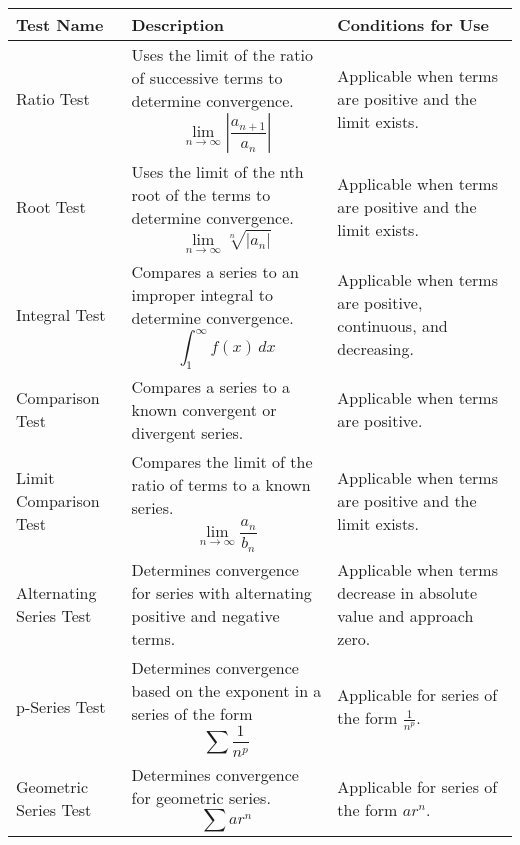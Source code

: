 \begin{table}[htbp]
    \centering
    \begin{tabular}{| m{3cm} | m{7cm} | m{4cm} |}
        \hline
        \textbf{Test Name}         & \textbf{Description}                                                                                                                   & \textbf{Conditions for Use}                                         \\
        \hline
        Ratio Test                 & Uses the limit of the ratio of successive terms to determine convergence. \[ \lim_{n \to \infty} \left| \frac{a_{n+1}}{a_n} \right| \] & Applicable when terms are positive and the limit exists.            \\
        \hline
        Root Test                  & Uses the limit of the nth root of the terms to determine convergence. \[ \lim_{n \to \infty} \sqrt[n]{|a_n|} \]                        & Applicable when terms are positive and the limit exists.            \\
        \hline
        Integral Test              & Compares a series to an improper integral to determine convergence. \[ \int_{1}^{\infty} f(x) \, dx \]                                 & Applicable when terms are positive, continuous, and decreasing.     \\
        \hline
        Comparison Test            & Compares a series to a known convergent or divergent series.                                                                           & Applicable when terms are positive.                                 \\
        \hline
        Limit Comparison Test      & Compares the limit of the ratio of terms to a known series. \[ \lim_{n \to \infty} \frac{a_n}{b_n} \]                                  & Applicable when terms are positive and the limit exists.            \\
        \hline
        Alternating Series Test    & Determines convergence for series with alternating positive and negative terms.                                                        & Applicable when terms decrease in absolute value and approach zero. \\
        \hline
        p-Series Test              & Determines convergence based on the exponent in a series of the form \[ \sum \frac{1}{n^p} \]                                          & Applicable for series of the form \(\frac{1}{n^p}\).                \\
        \hline
        Geometric Series Test      & Determines convergence for geometric series. \[ \sum ar^n \]                                                                           & Applicable for series of the form \(ar^n\).                         \\

\end{tabular}
\end{table}
